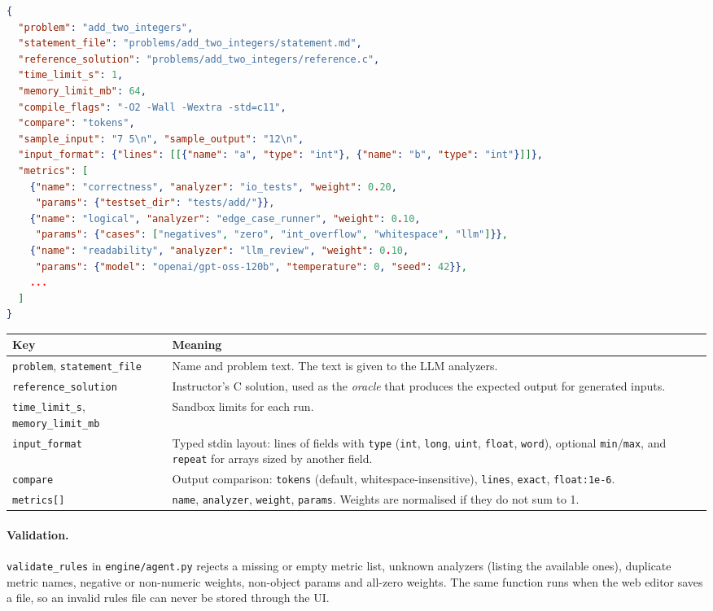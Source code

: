 \documentclass[11pt,a4paper]{article}
\newcommand{\file}[1]{\nolinkurl{#1}}
\newcommand{\fn}[1]{\nolinkurl{#1}}
\begin{document}
\begin{lstlisting}[language=json]
{
  "problem": "add_two_integers",
  "statement_file": "problems/add_two_integers/statement.md",
  "reference_solution": "problems/add_two_integers/reference.c",
  "time_limit_s": 1,
  "memory_limit_mb": 64,
  "compile_flags": "-O2 -Wall -Wextra -std=c11",
  "compare": "tokens",
  "sample_input": "7 5\n", "sample_output": "12\n",
  "input_format": {"lines": [[{"name": "a", "type": "int"}, {"name": "b", "type": "int"}]]},
  "metrics": [
    {"name": "correctness", "analyzer": "io_tests", "weight": 0.20,
     "params": {"testset_dir": "tests/add/"}},
    {"name": "logical", "analyzer": "edge_case_runner", "weight": 0.10,
     "params": {"cases": ["negatives", "zero", "int_overflow", "whitespace", "llm"]}},
    {"name": "readability", "analyzer": "llm_review", "weight": 0.10,
     "params": {"model": "openai/gpt-oss-120b", "temperature": 0, "seed": 42}},
    ...
  ]
}
\end{lstlisting}

\noindent\begin{tabularx}{\textwidth}{@{}>{\raggedright\arraybackslash}p{3.9cm}L@{}}
\toprule
\textbf{Key} & \textbf{Meaning} \\
\midrule
\texttt{problem}, \texttt{statement\_file} & Name and problem text. The text is given to the LLM analyzers. \\
\texttt{reference\_solution} & Instructor's C solution, used as the \emph{oracle} that produces the expected output for generated inputs. \\
\texttt{time\_limit\_s}, \texttt{memory\_limit\_mb} & Sandbox limits for each run. \\
\texttt{input\_format} & Typed stdin layout: lines of fields with \texttt{type} (\texttt{int}, \texttt{long}, \texttt{uint}, \texttt{float}, \texttt{word}), optional \texttt{min}/\texttt{max}, and \texttt{repeat} for arrays sized by another field. \\
\texttt{compare} & Output comparison: \texttt{tokens} (default, whitespace-insensitive), \texttt{lines}, \texttt{exact}, \texttt{float:1e-6}. \\
\texttt{metrics[]} & \texttt{name}, \texttt{analyzer}, \texttt{weight}, \texttt{params}. Weights are normalised if they do not sum to 1. \\
\bottomrule
\end{tabularx}

\paragraph{Validation.} \fn{validate_rules} in \file{engine/agent.py} rejects a missing or empty metric list,
unknown analyzers (listing the available ones), duplicate metric names, negative or non-numeric weights,
non-object params and all-zero weights. The same function runs when the web editor saves a file, so an
invalid rules file can never be stored through the UI.
\end{document}
